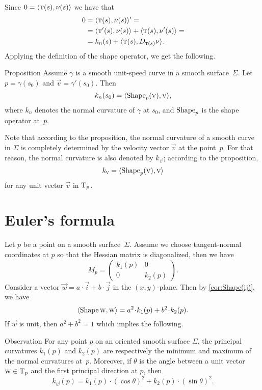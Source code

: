 Since $0=\langle \text{\sc{t}}(s),\nu(s)\rangle$ we have 
that 
\begin{align*}
0&=\langle \text{\sc{t}}(s),\nu(s)\rangle'=
\\
&=\langle \text{\sc{t}}'(s),\nu(s)\rangle+\langle \text{\sc{t}}(s),\nu'(s)\rangle=
\\
&=k_n(s)+\langle \text{\sc{t}}(s),D_{\text{\sc{t}}(s)}\nu\rangle.
\end{align*}
Applying the definition of the shape operator,
we get the following.

\begin{thm}{Proposition}\label{prop:normal-shape}
Assume $\gamma$ is a smooth unit-speed curve in a smooth surface~$\Sigma$.
Let $p=\gamma(s_0)$ and $\vec v=\gamma'(s_0)$.
Then 
\[k_n(s_0)=\langle \mathop{\rm Shape}\nolimits_p(\text{\sc{v}}),\text{\sc{v}}\rangle,\]
where $k_n$ denotes the normal curvature of $\gamma$ at $s_0$, and $\mathop{\rm Shape}\nolimits_p$ is the shape operator at~$p$.
\end{thm}

Note that according to the proposition, the normal curvature of a smooth curve in $\Sigma$ is completely determined by the velocity vector $\vec v$ at the point~$p$.
For that reason, the normal curvature is also denoted by $k_{\vec v}$;
according to the proposition,
\[k_{\text{\sc{v}}}=\langle \mathop{\rm Shape}\nolimits_p(\text{\sc{v}}),\text{\sc{v}}\rangle\]
for any unit vector $\vec v$ in $\mathrm{T}_p$.

\section{Euler's formula}

Let $p$ be a point on a smooth surface~$\Sigma$.
Assume we choose tangent-normal coordinates at $p$ so that the Hessian matrix is diagonalized, then we have
\[M_p=\begin{pmatrix}
 k_1(p)
 &0
 \\
 0
 &k_2(p)
 \end{pmatrix}.
\]
Consider a vector ${\vec w}=a\cdot\vec i+b\cdot\vec j$ in the $(x,y)$-plane.
Then by \ref{cor:Shape(ij)}, we have
\[
\langle \Shape\vec w,\vec w\rangle
=a^2\cdot k_1(p) +b^2\cdot k_2(p). 
\]
If ${\vec w}$ is unit, then $a^2+b^2=1$ which implies the following.

\begin{thm}{Observation}\label{obs:k1-k2}
For any point $p$ on an oriented smooth surface $\Sigma$,
the principal curvatures $k_1(p)$ and $k_2(p)$ are respectively the minimum and maximum of the normal curvatures at~$p$.
Moreover, if $\theta$ is the angle between a unit vector ${\text{\sc{w}}}\in\mathrm{T}_p$ and the first principal direction at $p$, then 
\[k_{\vec w}(p)=k_1(p)\cdot(\cos\theta)^2+k_2(p)\cdot(\sin\theta)^2.\]

\end{thm}

